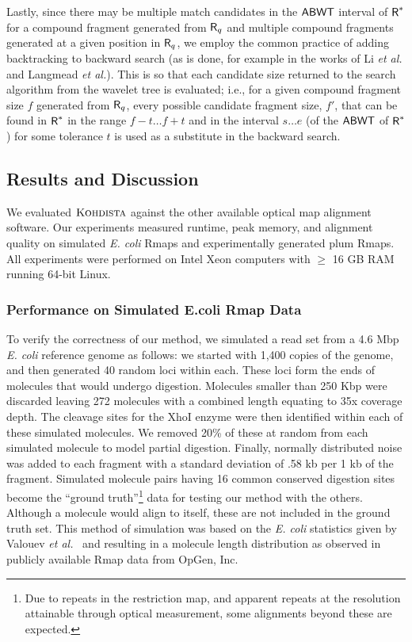 Lastly, since there may be multiple match candidates in the $\mbox{\rm {\sf ABWT}}$ interval of $\mbox{\rm {\sf R}}^*$
for a compound fragment generated from $\mbox{\rm {\sf R}}_q$ and multiple compound fragments generated at a given position in $\mbox{\rm {\sf R}}_q$, we employ the common practice of adding backtracking to backward search (as is done, for example in the works of Li {\it et al.} and Langmead {\it et al.}).   This is so that each candidate size returned to the search algorithm from the wavelet tree is evaluated; i.e., for a given compound fragment size $f$ generated from $\mbox{\rm {\sf R}}_q$, every possible candidate fragment size, $f'$, that can be found in $\mbox{\rm {\sf R}}^*$ in the range $f - t \ldots f + t$ and in the interval $s \ldots e$ (of the $\mbox{\rm {\sf ABWT}}$ of $\mbox{\rm {\sf R}}^*$) for some tolerance $t$ is used as a substitute in the backward search.

\subsection{Results and Discussion}
\label{sec-results-koh}



We evaluated $\mbox{\rm \textsc{Kohdista}}$ against the other available optical map alignment software.
Our experiments measured runtime, peak memory, and  alignment quality on simulated {\em E. coli} Rmaps and experimentally generated plum Rmaps.  All experiments were performed on Intel Xeon computers with $\ge$ 16 GB RAM running 64-bit Linux.




\subsubsection{Performance on Simulated E.coli Rmap Data}
\label{sec:ecoli-koh}

To verify the correctness of our method, we simulated a read set from a 4.6 Mbp \emph{E. coli} reference genome as follows:  we started with 1,400 copies of the genome, and then generated 40 random loci within each. These loci form the ends of molecules that would undergo digestion.  Molecules smaller than 250 Kbp were discarded leaving 272 molecules with a combined length equating to 35x coverage depth.  The cleavage sites for the XhoI enzyme were then identified within each of these simulated molecules. We removed 20\% of these at random from each simulated molecule to model partial digestion.  Finally, normally distributed noise was added to each fragment with a standard deviation of .58 kb per 1 kb of the fragment.  Simulated molecule pairs having 16 common conserved digestion sites become the ``ground truth''\footnote{Due to repeats in the restriction map, and apparent repeats at the resolution attainable through optical measurement, some alignments beyond these are expected.} data for testing our method with the others.  Although a molecule would align to itself, these are not included in the ground truth set. This method of simulation was based on the \emph{E. coli} statistics given by Valouev {\it et al.}~\cite{valouev2006algorithm} and resulting in a molecule length distribution as observed in publicly available Rmap data from OpGen, Inc.

